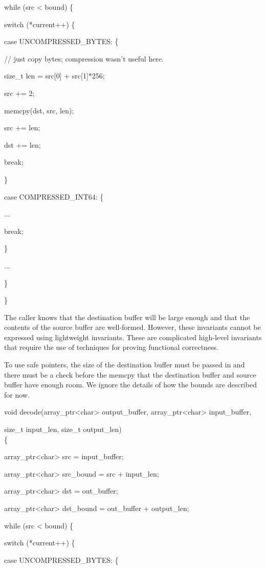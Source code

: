 \documentclass[]{article}
\begin{document}
while (src \textless{} bound) \{

switch (*current++) \{

case UNCOMPRESSED\_BYTES: \{

// just copy bytes; compression wasn't useful here.

size\_t len = src{[}0{]} + src{[}1{]}*256;

src += 2;

memcpy(dst, src, len);

src += len;

dst += len;

break;

\}

case COMPRESSED\_INT64: \{

...

break;

\}

...

\}

\}

The caller knows that the destination buffer will be large enough and
that the contents of the source buffer are well-formed. However, these
invariants cannot be expressed using lightweight invariants. These are
complicated high-level invariants that require the use of techniques for
proving functional correctness.

To use safe pointers, the size of the destination buffer must be passed
in and there must be a check before the memcpy that the destination
buffer and source buffer have enough room. We ignore the details of how
the bounds are described for now.

void decode(array\_ptr\textless{}char\textgreater{} output\_buffer,
array\_ptr\textless{}char\textgreater{} input\_buffer,

size\_t input\_len, size\_t output\_len)\\
\{

array\_ptr\textless{}char\textgreater{} src = input\_buffer;

array\_ptr\textless{}char\textgreater{} src\_bound = src + input\_len;

array\_ptr\textless{}char\textgreater{} dst = out\_buffer;

array\_ptr\textless{}char\textgreater{} dst\_bound = out\_buffer +
output\_len;

while (src \textless{} bound) \{

switch (*current++) \{

case UNCOMPRESSED\_BYTES: \{
\end{document}
